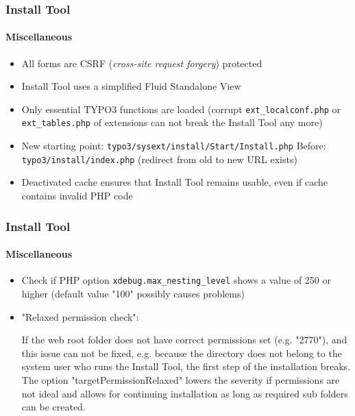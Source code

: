
\begin{frame}[fragile]
	\frametitle{Install Tool}
	\framesubtitle{Miscellaneous}

	\begin{itemize}
		\item All forms are CSRF (\textit{cross-site request forgery}) protected
		\item Install Tool uses a simplified Fluid Standalone View
		\item Only essential TYPO3 functions are loaded\newline
			(corrupt \texttt{ext\_localconf.php} or \texttt{ext\_tables.php} of extensions can not break the Install Tool any more)
		\item New starting point:	\tabto{3.2cm} \texttt{typo3/sysext/install/Start/Install.php}\newline
			Before:					\tabto{3.2cm} \texttt{typo3/install/index.php}\newline
									\tabto{3.2cm} (redirect from old to new URL exists)
		\item Deactivated cache ensures that Install Tool remains usable, even if cache contains invalid PHP code
	\end{itemize}

\end{frame}


\begin{frame}[fragile]
	\frametitle{Install Tool}
	\framesubtitle{Miscellaneous}

	\begin{itemize}
		\item Check if PHP option \texttt{xdebug.max\_nesting\_level} shows a value of 250 or higher (default value "100" possibly causes problems)
		\item "Relaxed permission check":

			\small
				If the web root folder does not have correct permissions set (e.g. "2770"),
				and this issue can not be fixed, e.g. because the directory does not belong
				to the system user who runs the Install Tool, the first step of the installation
				breaks.
				The option "targetPermissionRelaxed" lowers the severity if permissions are not
				ideal and allows for continuing installation as long as required sub folders can
				be created.
			\normalsize

	\end{itemize}

\end{frame}

